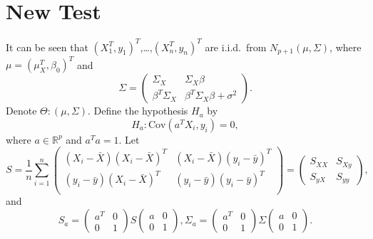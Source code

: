 \documentclass[review]{elsarticle}
\theoremstyle{plain}
\theoremstyle{definition}
\theoremstyle{remark}
\begin{document}
\section{New Test}
It can be seen that ${(X_1^T,y_1)}^T$,\ldots,${(X_n^T, y_n)}^T$ are i.i.d.\ from $N_{p+1}(\mu,\Sigma)$,
where
$\mu={(\mu_X^T,\beta_0)}^T$ and
\begin{equation}
    \Sigma=\begin{pmatrix}
        \Sigma_X &  \Sigma_X \beta \\
        \beta^T \Sigma_X & \beta^T \Sigma_X\beta+\sigma^2
    \end{pmatrix}.
\end{equation}
Denote $\Theta: (\mu,\Sigma)$.
Define the hypothesis $H_a$ by
\begin{equation}\label{Ha}
    H_a: \textrm{Cov}(a^T X_i, y_i)=0,
\end{equation}
where $a\in \mathbb{R}^p$ and $a^T a=1$.
Let
\begin{equation}
    S=\frac{1}{n}\sum_{i=1}^n \begin{pmatrix}
        (X_i-\bar{X}){(X_i-\bar{X})}^T&(X_i-\bar{X}){(y_i-\bar{y})}^T\\
        (y_i-\bar{y}){(X_i-\bar{X})}^T&(y_i-\bar{y}){(y_i-\bar{y})}^T\\
        \end{pmatrix}=\begin{pmatrix}S_{XX} & S_{Xy} \\ S_{yX}& S_{yy}\end{pmatrix},
\end{equation}
and
\begin{equation}
    S_a=\begin{pmatrix}
        a^T& 0\\
        0& 1
    \end{pmatrix}
    S\begin{pmatrix}
        a& 0\\
        0& 1
    \end{pmatrix},
    \Sigma_a=\begin{pmatrix}
        a^T& 0\\
        0& 1
    \end{pmatrix}
    \Sigma\begin{pmatrix}
        a& 0\\
        0& 1
    \end{pmatrix}.
\end{equation}
\end{document}

